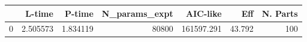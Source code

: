 \begin{tabular}{lrrrrrr}
\toprule
{} &    L-time &    P-time &  N\_params\_expt &    AIC-like &     Eff &  N. Parts \\
\midrule
0 &  2.505573 &  1.834119 &          80800 &  161597.291 &  43.792 &       100 \\
\bottomrule
\end{tabular}
